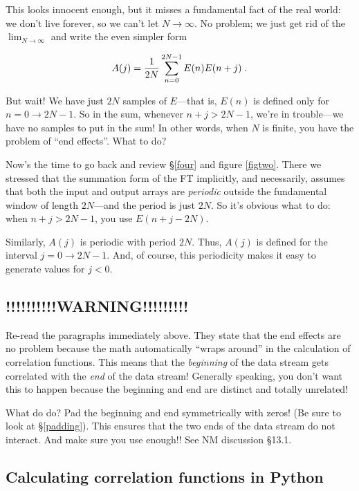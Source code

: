 \documentclass[11pt,preprint]{aastex}
\begin{document}
        This looks innocent enough, but it misses a fundamental fact of
the real world: we don't live forever, so we can't let $N \rightarrow
\infty$.  No problem; we just get rid of the $\lim_{N \to \infty}$ and  
write the even simpler form

\begin{equation}
A(j) = {1 \over 2N} \sum_{n=0}^{2N-1} E(n) E(n + j) \; .
\end{equation}

\noindent But wait! We have just $2N$ samples of $E$---that is, $E(n)$
is defined only for $n = 0 \rightarrow 2N-1$.  So in the sum, whenever
$n+j > 2N-1$, we're in trouble---we have no samples to put in the sum!
In other words, when $N$ is finite, you have the problem of ``end
effects''.  What to do?

        Now's the time to go back and review \S \ref{four} and figure
\ref{figtwo}. There we stressed that the summation form of the FT
implicitly, and necessarily, assumes that both the input and output
arrays are {\it periodic} outside the fundamental window of length
$2N$---and the period is just $2N$.  So it's obvious what to do: when
$n+j > 2N-1$, you use $E(n+j-2N)$.

        Similarly, $A(j)$ is periodic with period $2N$.  Thus, $A(j)$ is
defined for the interval $j = 0 \rightarrow 2N-1$. And, of course, this
periodicity makes it easy to generate values for $j < 0$.
        
\subsection{!!!!!!!!!!WARNING!!!!!!!!!}

	Re-read the paragraphs immediately above. They state that the
end effects are no problem because the math automatically ``wraps
around'' in the calculation of correlation functions. This means that
the {\it beginning} of the data stream gets correlated with the {\it
end} of the data stream! Generally speaking, you don't want this to
happen because the beginning and end are distinct and totally unrelated!

	What do do? Pad the beginning and end symmetrically with zeros!
(Be sure to look at \S \ref{padding}). This ensures that the two ends of
the data stream do not interact. And make sure you use enough!! See NM
discussion \S 13.1. 

\subsection{Calculating correlation functions in Python}
\end{document}
